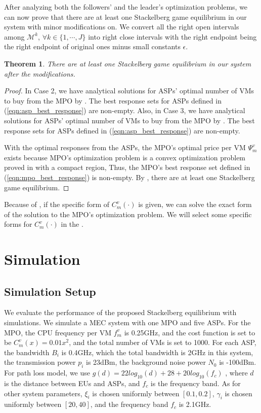 \documentclass[conference]{IEEEtran}
\newtheorem{theorem}{Theorem}
\begin{document}
After analyzing both the followers' and the leader's optimization problems, we can now prove that there are at least one Stackelberg game equilibrium in our system with minor modifications on. We convert all the right open intervals among $\mathcal{M}^k$, $\forall k \in \{1, \cdots, J\}$ into right close intervals with the right endpoint being the right endpoint of original ones minus small constants $\epsilon$. 
\begin{theorem} \label{thm:stackelberg_game_equilibrium}
There are at least one Stackelberg game equilibrium in our system after the modifications.
\end{theorem}
\begin{proof}

In Case 2, we have analytical solutions for ASPs' optimal number of VMs to buy from the MPO by . The best response sets for ASPs defined in (\ref{eqn:asp_best_response}) are non-empty. Also, in Case 3, we have analytical solutions for ASPs' optimal number of VMs to buy from the MPO by . The best response sets for ASPs defined in (\ref{eqn:asp_best_response}) are non-empty. 

With the optimal responses from the ASPs, the MPO's optimal price per VM $\Psi_m^v$ exists because MPO's optimization problem is a convex optimization problem proved in  with a compact region, Thus, the MPO's best response set defined in (\ref{eqn:mpo_best_response}) is non-empty. By , there are at least one Stackelberg game equilibrium.
\end{proof}
Because of , if the specific form of $C_m^v(\cdot)$ is given, we can solve the exact form of the solution to the MPO's optimization problem. We will select some specific forms for $C_m^v(\cdot)$ in the .



\section{Simulation} \label{sec:simulation}
\subsection{Simulation Setup}
We evaluate the performance of the proposed Stackelberg equilibrium with simulations. We simulate a MEC system with one MPO and five ASPs. For the MPO, the CPU frequency per VM $f_m^v$ is 0.25GHz, and the cost function is set to be $C_m^v(x) = 0.01x^2$, and the total number of VMs is set to 1000. For each ASP, the bandwidth $B_i$ is 0.4GHz, which the total bandwidth is 2GHz in this system, the transmission power $p_i$ is 23dBm\cite{3gpp.36.101}, the background noise power $N_0$ is -100dBm\cite{chen2015efficient}. For path loss model, we use $g(d)=22log_{10}(d)+28+20log_{10}(f_c)$ \cite{3gpp.36.814}, where $d$ is the distance between EUs and ASPs, and $f_c$ is the frequency band. As for other system parameters, $\xi_{i}$ is chosen uniformly between $[0.1, 0.2]$, $\gamma_i$ is chosen uniformly between $[20, 40]$, and the frequency band $f_c$ is 2.1GHz.
\end{document}
